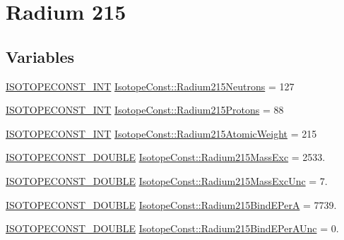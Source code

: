 \hypertarget{group___isotope_const-_radium-_ra215}{}\section{Radium 215}
\label{group___isotope_const-_radium-_ra215}
\subsection*{Variables}
\begin{DoxyCompactItemize}
\item 
\mbox{\hyperlink{group___isotope_const-_macros_ga5f18360b3e99483a35c32d789e62621c}{I\+S\+O\+T\+O\+P\+E\+C\+O\+N\+S\+T\+\_\+\+I\+NT}} \mbox{\hyperlink{group___isotope_const-_radium-_ra215_ga143b2df36697746af41dff3c70593a70}{Isotope\+Const\+::\+Radium215\+Neutrons}} = 127
\item 
\mbox{\hyperlink{group___isotope_const-_macros_ga5f18360b3e99483a35c32d789e62621c}{I\+S\+O\+T\+O\+P\+E\+C\+O\+N\+S\+T\+\_\+\+I\+NT}} \mbox{\hyperlink{group___isotope_const-_radium-_ra215_gae1d383b7addb2be1192161dcf87b58ea}{Isotope\+Const\+::\+Radium215\+Protons}} = 88
\item 
\mbox{\hyperlink{group___isotope_const-_macros_ga5f18360b3e99483a35c32d789e62621c}{I\+S\+O\+T\+O\+P\+E\+C\+O\+N\+S\+T\+\_\+\+I\+NT}} \mbox{\hyperlink{group___isotope_const-_radium-_ra215_ga7a604a785ca10d384570a8ea1270a8b9}{Isotope\+Const\+::\+Radium215\+Atomic\+Weight}} = 215
\item 
\mbox{\hyperlink{group___isotope_const-_macros_ga8f45a7272ce02c0b4c65c44636ed719a}{I\+S\+O\+T\+O\+P\+E\+C\+O\+N\+S\+T\+\_\+\+D\+O\+U\+B\+LE}} \mbox{\hyperlink{group___isotope_const-_radium-_ra215_ga44ddd6a6f508b1a00e45c3d565f3cce7}{Isotope\+Const\+::\+Radium215\+Mass\+Exc}} = 2533.
\item 
\mbox{\hyperlink{group___isotope_const-_macros_ga8f45a7272ce02c0b4c65c44636ed719a}{I\+S\+O\+T\+O\+P\+E\+C\+O\+N\+S\+T\+\_\+\+D\+O\+U\+B\+LE}} \mbox{\hyperlink{group___isotope_const-_radium-_ra215_ga7d5d9148d9adaf183bb515491310cf92}{Isotope\+Const\+::\+Radium215\+Mass\+Exc\+Unc}} = 7.
\item 
\mbox{\hyperlink{group___isotope_const-_macros_ga8f45a7272ce02c0b4c65c44636ed719a}{I\+S\+O\+T\+O\+P\+E\+C\+O\+N\+S\+T\+\_\+\+D\+O\+U\+B\+LE}} \mbox{\hyperlink{group___isotope_const-_radium-_ra215_ga20e271dc25733f79b5896498d06f1412}{Isotope\+Const\+::\+Radium215\+Bind\+E\+PerA}} = 7739.
\item 
\mbox{\hyperlink{group___isotope_const-_macros_ga8f45a7272ce02c0b4c65c44636ed719a}{I\+S\+O\+T\+O\+P\+E\+C\+O\+N\+S\+T\+\_\+\+D\+O\+U\+B\+LE}} \mbox{\hyperlink{group___isotope_const-_radium-_ra215_gaf9852218e81b99604b63817604b7bd7b}{Isotope\+Const\+::\+Radium215\+Bind\+E\+Per\+A\+Unc}} = 0.

\end{DoxyCompactItemize}
